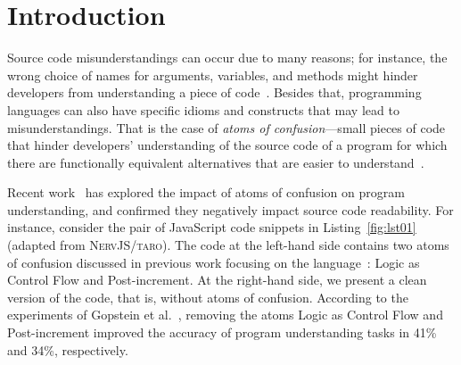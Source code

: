 \section{Introduction}
\label{intro}





Source code misunderstandings can occur due to many reasons; for instance, the wrong choice of names for arguments, variables, and methods might hinder developers from understanding a piece of code~\cite{avidan:icpc2017}. Besides that, programming languages can also have specific idioms and constructs that may lead to misunderstandings. That is the case of \emph{atoms of confusion}---small pieces of code that hinder developers' understanding of the source code of a program for which there are functionally equivalent alternatives that are easier to understand~\cite{DBLP:conf/sigsoft/GopsteinIYDZYC17, DBLP:conf/msr/GopsteinZFC18}.

Recent work~\cite{DBLP:journals/ese/MedeirosLAAKRG19,DBLP:conf/sigsoft/GopsteinIYDZYC17,Langhout:2021:ACJ} has explored the impact of atoms of confusion on program understanding, and confirmed they negatively impact source code readability. For instance, consider the pair of JavaScript code snippets in Listing~\ref{fig:lst01} (adapted from \textsc{NervJS/taro}). The code at the left-hand side contains two atoms of confusion discussed in previous work focusing on the \clang language~\cite{DBLP:conf/sigsoft/GopsteinIYDZYC17}: Logic as Control Flow and Post-increment. At the right-hand side, we present a clean version of the code, that is, without atoms of confusion. According to the experiments of Gopstein et al.~\cite{DBLP:conf/sigsoft/GopsteinIYDZYC17}, removing the atoms Logic as Control Flow and Post-increment improved the accuracy of program understanding tasks in 41\% and 34\%, respectively.

